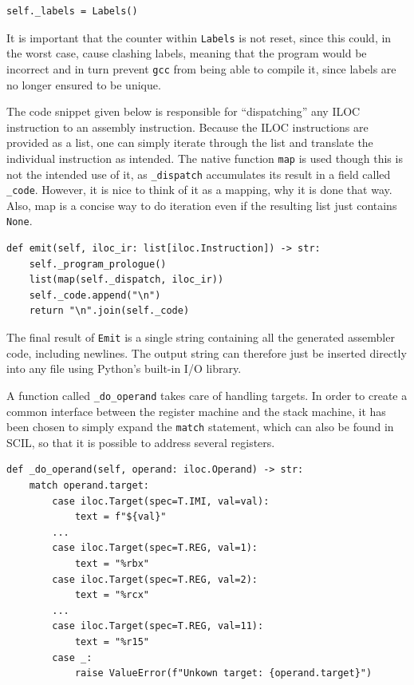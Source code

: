 \begin{verbatim}
self._labels = Labels()
\end{verbatim}

It is important that the counter within \texttt{Labels} is not reset, since this could, in the worst case, cause clashing labels, meaning that the program would be incorrect and in turn prevent \texttt{gcc} from being able to compile it, since labels are no longer ensured to be unique.

The code snippet given below is responsible for ``dispatching'' any ILOC instruction to an assembly instruction. Because the ILOC instructions are provided as a list, one can simply iterate through the list and translate the individual instruction as intended. The native function \texttt{map} is used though this is not the intended use of it, as \texttt{\_dispatch} accumulates its result in a field called \texttt{\_code}. However, it is nice to think of it as a mapping, why it is done that way. Also, map is a concise way to do iteration even if the resulting list just contains \texttt{None}.

\begin{verbatim}
def emit(self, iloc_ir: list[iloc.Instruction]) -> str:
    self._program_prologue()
    list(map(self._dispatch, iloc_ir))
    self._code.append("\n")
    return "\n".join(self._code)
\end{verbatim}

The final result of \texttt{Emit} is a single string containing all the generated assembler code, including newlines. The output string can therefore just be inserted directly into any file using Python's built-in I/O library.

A function called \texttt{\_do\_operand} takes care of handling targets. In order to create a common interface between the register machine and the stack machine, it has been chosen to simply expand the \texttt{match} statement, which can also be found in SCIL, so that it is possible to address several registers.

\begin{verbatim}
def _do_operand(self, operand: iloc.Operand) -> str:
    match operand.target:
        case iloc.Target(spec=T.IMI, val=val):
            text = f"${val}"
        ...
        case iloc.Target(spec=T.REG, val=1):
            text = "%rbx"
        case iloc.Target(spec=T.REG, val=2):
            text = "%rcx"
        ...
        case iloc.Target(spec=T.REG, val=11):
            text = "%r15"
        case _:
            raise ValueError(f"Unkown target: {operand.target}")
\end{verbatim}


